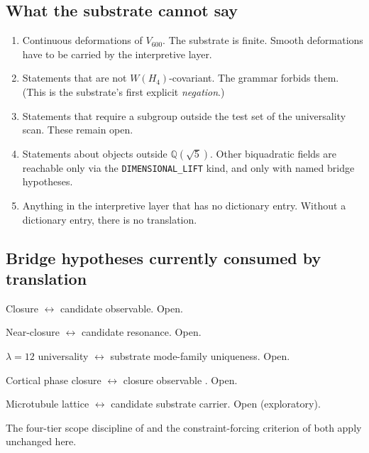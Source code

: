 \documentclass[11pt,a4paper]{article}
\newcommand{\Vsix}{V_{600}}
\newcommand{\Q}{\mathbb{Q}}
\begin{document}
\subsection{What the substrate cannot say}

\begin{enumerate}[leftmargin=*]
  \item Continuous deformations of $\Vsix$. The substrate is
        finite. Smooth deformations have to be carried by the
        interpretive layer.
  \item Statements that are not $W(H_4)$-covariant. The grammar
        forbids them. (This is the substrate's first explicit
        \emph{negation}.)
  \item Statements that require a subgroup outside the test set
        of the universality scan. These remain open.
  \item Statements about objects outside $\Q(\sqrt 5)$. Other
        biquadratic fields are reachable only via the
        \texttt{DIMENSIONAL\_LIFT} kind, and only with named
        bridge hypotheses.
  \item Anything in the interpretive layer that has no dictionary
        entry. Without a dictionary entry, there is no
        translation.
\end{enumerate}

\subsection{Bridge hypotheses currently consumed by translation}

\begin{description}[leftmargin=*]
  \item[H-Observable.] Closure $\leftrightarrow$ candidate
        observable. Open.
  \item[H-Resonance.] Near-closure $\leftrightarrow$ candidate
        resonance. Open.
  \item[H-ModeUnique.] $\lambda = 12$ universality
        $\leftrightarrow$ substrate mode-family uniqueness. Open.
  \item[H-CortexClosure.] Cortical phase closure
        $\leftrightarrow$ closure observable
        \cite{closurePicture}. Open.
  \item[H-MT-Bridge.] Microtubule lattice $\leftrightarrow$
        candidate substrate carrier. Open (exploratory).
\end{description}

The four-tier scope discipline of
\cite[\S 9]{closurePicture} and the constraint-forcing criterion
of \cite[\S 5]{evidenceLedger} both apply unchanged here.
\end{document}
